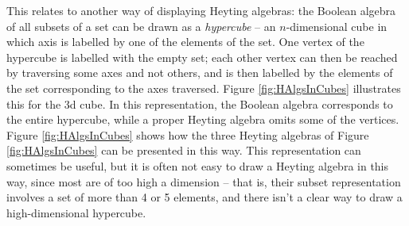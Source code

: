 This relates to another way of displaying Heyting algebras: the Boolean algebra of all subsets of a set can be drawn as a \emph{hypercube} -- an $n$-dimensional cube in which axis is labelled by one of the elements of the set.  One vertex of the hypercube is labelled with the empty set; each other vertex can then be reached by traversing some axes and not others, and is then labelled by the elements of the set corresponding to the axes traversed.  Figure \ref{fig:HAlgsInCubes}
 illustrates this for the 3d cube.  In this representation, the Boolean algebra corresponds to the entire hypercube, while a proper Heyting algebra omits some of the vertices. Figure \ref{fig:HAlgsInCubes}
 shows how the three Heyting algebras of Figure \ref{fig:HAlgsInCubes}
 can be presented in this way.  This representation can sometimes be useful, but it is often not easy to draw a Heyting algebra in this way, since most are of too high a dimension -- that is, their subset representation involves a set of more than 4 or 5 elements, and there isn't a clear way to draw a high-dimensional hypercube.

